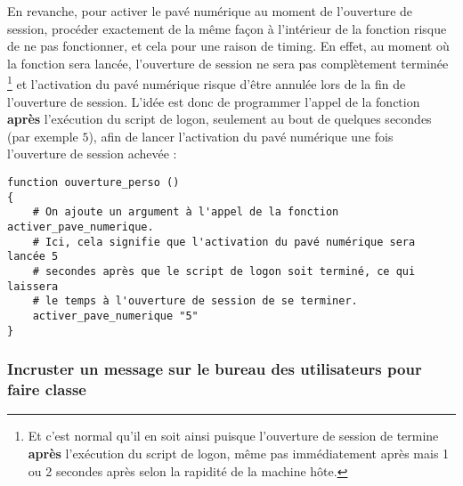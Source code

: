 En revanche, pour activer le pavé numérique au moment de
l'ouverture de session, procéder exactement de la même façon à l'intérieur
de la fonction  risque de ne pas
fonctionner, et cela pour une raison de timing.
En effet, au moment où la fonction 
sera lancée, l'ouverture de session ne sera pas complètement
terminée%
%
\footnote{Et c'est normal qu'il en soit ainsi puisque l'ouverture
de session de termine \textbf{après} l'exécution du script de logon, même
pas immédiatement après mais 1 ou 2 secondes après selon la
rapidité de la machine hôte.}
%
et l'activation du pavé numérique risque d'être
annulée lors de la fin de l'ouverture de session. L'idée est
donc de programmer l'appel de la fonction 
\textbf{après} l'exécution du script de logon,
seulement au bout de quelques secondes (par exemple $5$), afin de
lancer l'activation du pavé numérique une fois l'ouverture de session
achevée :
%
\begin{lstlisting}
function ouverture_perso ()
{
    # On ajoute un argument à l'appel de la fonction activer_pave_numerique.
    # Ici, cela signifie que l'activation du pavé numérique sera lancée 5
    # secondes après que le script de logon soit terminé, ce qui laissera
    # le temps à l'ouverture de session de se terminer.
    activer_pave_numerique "5"
}
\end{lstlisting}
%


\subsubsection{Incruster un message sur le bureau des utilisateurs pour faire classe}
\label{conky}

